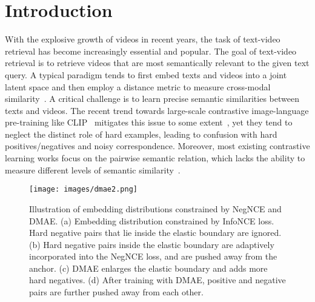 \documentclass[sigconf]{acmart}
\begin{document}
\maketitle

\section{Introduction}
With the explosive growth of videos in recent years, the task of text-video retrieval has become increasingly essential and popular.
The goal of text-video retrieval is to retrieve videos that are most semantically relevant to the given text query.
A typical paradigm tends to first embed texts and videos into a joint latent space and then employ a distance metric to measure cross-modal similarity~\cite{HERO,univl2020,MMT,clip4clip2021,clip2video2021}. 
A critical challenge is to learn precise semantic similarities between texts and videos. The recent trend towards large-scale contrastive image-language pre-training like CLIP~\cite{clip2021} mitigates this issue to some extent~\cite{clip4clip2021,ts2net2022,xclip2022},
yet they tend to neglect the distinct role of hard examples, 
leading to confusion with hard positives/negatives and noisy correspondence. 
Moreover, most existing contrastive learning works focus on the pairwise semantic relation, which lacks the ability to measure different levels of semantic similarity~\cite{zhang2022ArcCSE}.



\begin{figure}[ht!] \centering
  \texttt{[image: images/dmae2.png]}
  \caption{Illustration of embedding distributions constrained by NegNCE and DMAE. 
  (a) Embedding distribution constrained by InfoNCE loss. Hard negative pairs that lie inside the elastic boundary are ignored. (b) Hard negative pairs inside the elastic boundary are adaptively incorporated into the NegNCE loss, and are pushed away from the anchor. (c) DMAE enlarges the elastic boundary and adds more hard negatives. (d) After training with DMAE, positive and negative pairs are further pushed away from each other. }
\label{fig:dmae}
\end{figure}
\end{document}
